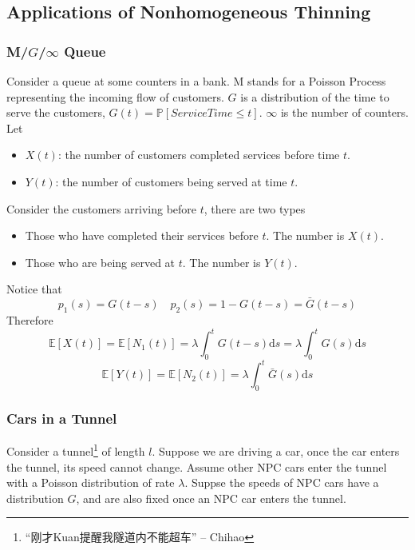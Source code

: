     \subsection{Applications of Nonhomogeneous Thinning}

        \subsubsection{M/$G$/$\infty$ Queue}
        Consider a queue at some counters in a bank. M stands for a Poisson Process representing the incoming flow of customers. $G$ is a distribution of the time to serve the customers, $G(t) = \mathbb{P}[ServiceTime \le t]$. $\infty$ is the number of counters. Let
        \begin{itemize}
            \item $X(t)$: the number of customers completed services before time $t$.
            \item $Y(t)$: the number of customers being served at time $t$.
        \end{itemize}

        Consider the customers arriving before $t$, there are two types
        \begin{itemize}
            \item Those who have completed their services before $t$. The number is $X(t)$.
            \item Those who are being served at $t$. The number is $Y(t)$.
        \end{itemize}

        Notice that
        \[ p_1(s) = G(t-s) \quad p_2(s) = 1 - G(t-s) = \bar{G}(t-s) \]
        Therefore
        \[ \mathbb{E}[X(t)] = \mathbb{E}[N_1(t)] = \lambda\int_0^t G(t-s)\mathrm{d}s = \lambda\int_0^t G(s)\mathrm{d}s \]
        \[ \mathbb{E}[Y(t)] = \mathbb{E}[N_2(t)] = \lambda\int_0^t \bar{G}(s)\mathrm{d}s \]

        \subsubsection{Cars in a Tunnel}
        Consider a tunnel\footnote{“刚才Kuan提醒我隧道内不能超车” -- Chihao} of length $l$. Suppose we are driving a car, once the car enters the tunnel, its speed cannot change. Assume other NPC cars enter the tunnel with a Poisson distribution of rate $\lambda$. Suppse the speeds of NPC cars have a distribution $G$, and are also fixed once an NPC car enters the tunnel.

